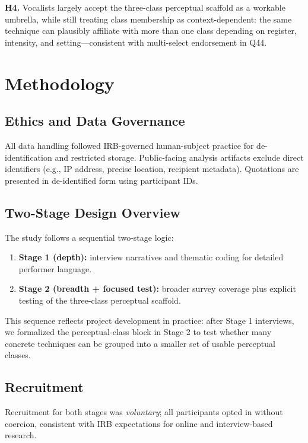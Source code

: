 \documentclass{article}
\begin{document}
\textbf{H4.} Vocalists largely accept the three-class perceptual scaffold as a workable umbrella, while still treating class membership as context-dependent: the same technique can plausibly affiliate with more than one class depending on register, intensity, and setting---consistent with multi-select endorsement in Q44.

\section{Methodology}
\subsection{Ethics and Data Governance}
All data handling followed IRB-governed human-subject practice for de-identification and restricted storage.
Public-facing analysis artifacts exclude direct identifiers (e.g., IP address, precise location, recipient metadata).
Quotations are presented in de-identified form using participant IDs.

\subsection{Two-Stage Design Overview}
The study follows a sequential two-stage logic:
\begin{enumerate}
    \item \textbf{Stage 1 (depth):} interview narratives and thematic coding for detailed performer language.
    \item \textbf{Stage 2 (breadth + focused test):} broader survey coverage plus explicit testing of the three-class perceptual scaffold.
\end{enumerate}

This sequence reflects project development in practice: after Stage 1 interviews, we formalized the perceptual-class block in Stage 2 to test whether many concrete techniques can be grouped into a smaller set of usable perceptual classes.

\subsection{Recruitment}
Recruitment for both stages was \emph{voluntary}; all participants opted in without coercion, consistent with IRB expectations for online and interview-based research.
\end{document}
